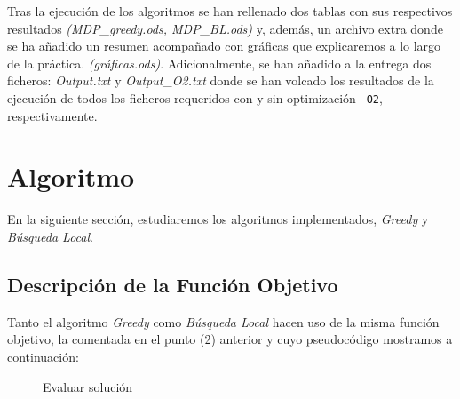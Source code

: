 Tras la ejecución de los algoritmos se han rellenado dos tablas con sus respectivos resultados \textit{(MDP\_greedy.ods, MDP\_BL.ods)} y, además, un archivo extra donde se ha añadido un resumen acompañado con gráficas que explicaremos a lo largo de la práctica. \textit{(gráficas.ods)}. Adicionalmente, se han añadido a la entrega dos ficheros: \textit{Output.txt} y \textit{Output\_O2.txt} donde se han volcado los resultados de la ejecución de todos los ficheros requeridos con y sin optimización \texttt{-O2}, respectivamente.



\section{Algoritmo}

 \hspace{1.5cm }En la siguiente sección, estudiaremos los algoritmos implementados, \textit{Greedy} y \textit{Búsqueda Local}.


\subsection{Descripción de la Función Objetivo}

Tanto el algoritmo \textit{Greedy} como \textit{Búsqueda Local} hacen uso de la misma función objetivo, la comentada en el punto (2) anterior y cuyo pseudocódigo mostramos a continuación:


\begin{figure}[H]
	\centering
	\begin{minipage}{.9\linewidth}
		
		
		
		\begin{algorithm}[H] 
			
			\caption{Evaluar solución}
			\SetAlgoLined
			
			
			
		\end{algorithm} 
		
	\end{minipage}
\end{figure}


